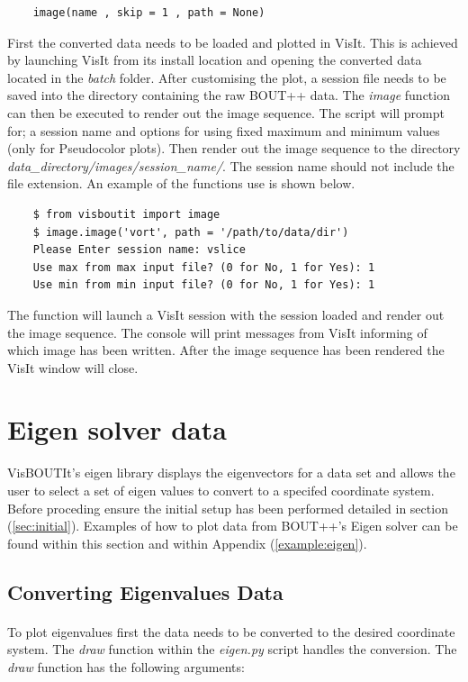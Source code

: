 \documentclass[12pt,a4paper]{article}
\begin{document}
	\begin{verbatim}
	image(name , skip = 1 , path = None)
	\end{verbatim}
		
	First the converted data needs to be loaded and plotted in VisIt. This is achieved by launching VisIt from its install location and opening the converted data located in the \textit{batch} folder. After customising the plot, a session file needs to be saved into the directory containing the raw BOUT++ data. The \textit{image} function can then be executed to render out the image sequence.	The script will prompt for; a session name and options for using fixed maximum and minimum values (only for Pseudocolor plots). Then render out the image sequence to the directory \textit{data\_directory/images/session\_name/}. The session name should not include the file extension. An example of the functions use is shown below.
	
	\begin{verbatim}
	$ from visboutit import image
	$ image.image('vort', path = '/path/to/data/dir')
	Please Enter session name: vslice
	Use max from max input file? (0 for No, 1 for Yes): 1
	Use min from min input file? (0 for No, 1 for Yes): 1
	\end{verbatim}
	
	The function will launch a VisIt session with the session loaded and render out the image sequence. The console will print messages from VisIt informing of which image has been written. After the image sequence has been rendered the VisIt window will close.
		
\section{Eigen solver data}
\label{sec:eigen}
VisBOUTIt's eigen library displays the eigenvectors for a data set and allows the user to select a set of eigen values to convert to a specifed coordinate system. Before proceding ensure the initial setup has been performed detailed in section (\ref{sec:initial}). Examples of how to plot data from BOUT++'s Eigen solver can be found within this section and within Appendix (\ref{example:eigen}).
	
	\subsection{Converting Eigenvalues Data}
	\paragraph{}
	To plot eigenvalues first the data needs to be converted to the desired coordinate system. The \textit{draw} function within the \textit{eigen.py} script handles the conversion. The \textit{draw} function has the following arguments:
	
\end{document}
